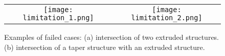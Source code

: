 \begin{figure} [htbp]
\begin{center}
\begin{tabular}{cc}
\texttt{[image: limitation\_1.png]} &
\texttt{[image: limitation\_2.png]}
\end{tabular}
\end{center}
\caption{Examples of failed cases:
      (a) intersection of two extruded structures.
      (b) intersection of a taper structure with an extruded structure.}
\label{fig:ER_Lmt}
\end{figure}




